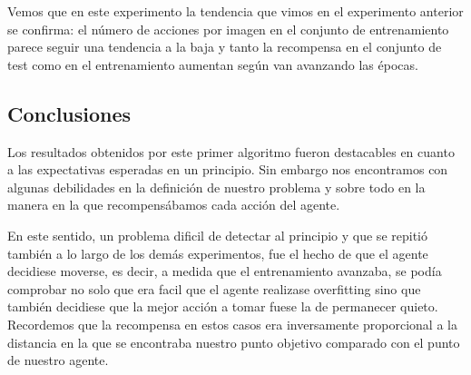 Vemos que en este experimento la tendencia que vimos en el experimento anterior se confirma: el número de acciones por imagen en el conjunto de entrenamiento parece seguir una tendencia a la baja y tanto la recompensa en el conjunto de test como en el entrenamiento aumentan según van avanzando las épocas.
\medskip

\subsection{Conclusiones}
\label{resultados-policy-gradient-conclusiones}

Los resultados obtenidos por este primer algoritmo fueron destacables en cuanto a las expectativas esperadas en un principio. Sin embargo nos encontramos con algunas debilidades en la definición de nuestro problema y sobre todo en la manera en la que recompensábamos cada acción del agente.
\medskip

En este sentido, un problema dificil de detectar al principio y que se repitió también a lo largo de los demás experimentos, fue el hecho de que el agente decidiese moverse, es decir, a medida que el entrenamiento avanzaba, se podía comprobar no solo que era facil que el agente realizase overfitting sino que también decidiese que la mejor acción a tomar fuese la de permanecer quieto. Recordemos que la recompensa en estos casos era inversamente proporcional a la distancia en la que se encontraba nuestro punto objetivo comparado con el punto de nuestro agente.
\medskip

